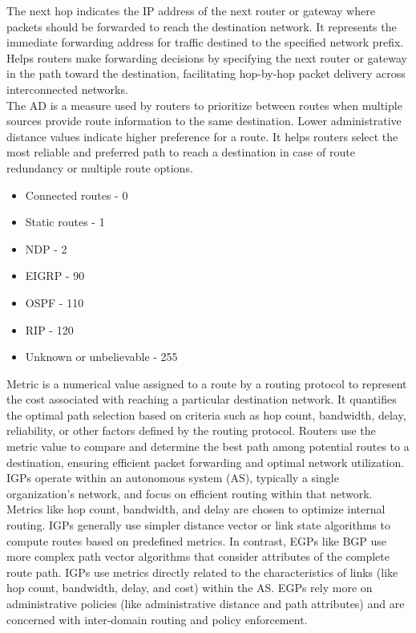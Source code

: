 \documentclass{article}
\begin{document}
	The next hop indicates the IP address of the next router or gateway where packets should be forwarded to reach the destination network. It represents the immediate forwarding address for traffic destined to the specified network prefix. Helps routers make forwarding decisions by specifying the next router or gateway in the path toward the destination, facilitating hop-by-hop packet delivery across interconnected networks.\\
	
	The AD is a measure used by routers to prioritize between routes when multiple sources provide route information to the same destination. Lower administrative distance values indicate higher preference for a route. It helps routers select the most reliable and preferred path to reach a destination in case of route redundancy or multiple route options.
	
\begin{itemize}
\item Connected routes - 0
\item Static routes - 1
\item NDP - 2
\item EIGRP - 90
\item OSPF - 110
\item RIP - 120
\item Unknown or unbelievable - 255
\end{itemize}

	Metric is a numerical value assigned to a route by a routing protocol to represent the cost associated with reaching a particular destination network. It quantifies the optimal path selection based on criteria such as hop count, bandwidth, delay, reliability, or other factors defined by the routing protocol. Routers use the metric value to compare and determine the best path among potential routes to a destination, ensuring efficient packet forwarding and optimal network utilization. IGPs operate within an autonomous system (AS), typically a single organization's network, and focus on efficient routing within that network. Metrics like hop count, bandwidth, and delay are chosen to optimize internal routing. IGPs generally use simpler distance vector or link state algorithms to compute routes based on predefined metrics. In contrast, EGPs like BGP use more complex path vector algorithms that consider attributes of the complete route path. IGPs use metrics directly related to the characteristics of links (like hop count, bandwidth, delay, and cost) within the AS. EGPs rely more on administrative policies (like administrative distance and path attributes) and are concerned with inter-domain routing and policy enforcement.\\
	
\end{document}
